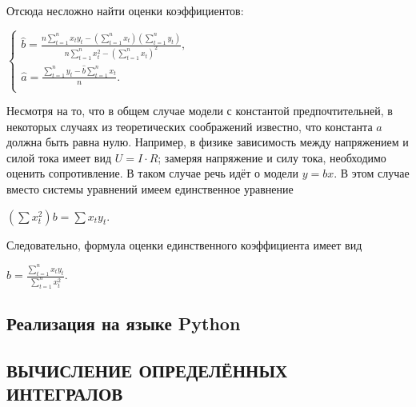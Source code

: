 \documentclass[a4paper]{article}
\begin{document}
{{{{{{{{Отсюда несложно найти оценки коэффициентов:

\begin{center}
    {{\(\left\{ \begin{matrix}
    {\hat{b} = \frac{n\sum\limits_{t = 1}^{n}x_{t}y_{t} - \left( {\sum\limits_{t = 1}^{n}x_{t}} \right)\left( {\sum\limits_{t = 1}^{n}y_{t}} \right)}{n\sum\limits_{t = 1}^{n}x_{t}^{2} - \left( {\sum\limits_{t = 1}^{n}x_{t}} \right)^{2}},} \\
    {\hat{a} = \frac{\sum\limits_{t = 1}^{n}y_{t} - \hat{b}\sum\limits_{t = 1}^{n}x_{t}}{n}.} \\
    \end{matrix} \right.\)}}
\end{center}

Несмотря на то, что в общем случае модели с константой предпочтительней,
в некоторых случаях из теоретических соображений известно, что константа
{{\(a\)}} должна быть равна нулю. Например, в физике зависимость между
напряжением и силой тока имеет вид {{\(U = I \cdot R\)}}; замеряя
напряжение и силу тока, необходимо оценить сопротивление. В таком случае
речь идёт о модели {{\(y = bx\)}}. В этом случае вместо системы
уравнений имеем единственное уравнение

\begin{center}
    {{\(\left( {\sum x_{t}^{2}} \right)b = \sum x_{t}y_{t}\)}}.
\end{center}

Следовательно, формула оценки единственного коэффициента имеет вид

\begin{center}
    {{\(\hat{b} = \frac{\sum\limits_{t = 1}^{n}x_{t}y_{t}}{\sum\limits_{t = 1}^{n}x_{t}^{2}}\)}}.
\end{center}

\subsection{Реализация на языке Python}






\newpage

\begin{center}
 \section{ВЫЧИСЛЕНИЕ ОПРЕДЕЛЁННЫХ ИНТЕГРАЛОВ}
\end{center}

}}}}}}}}
\end{document}
